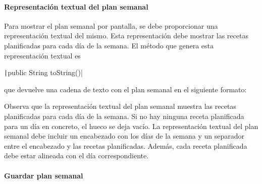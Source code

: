 \documentclass[
    a4paper, %
    12pt, %
]{CSSullivanBusinessReport}
\begin{document}
\paragraph{Representación textual del plan semanal}

Para mostrar el plan semanal por pantalla, se debe proporcionar una representación textual del mismo. Esta representación debe mostrar las recetas planificadas para cada día de la semana. El método que genera esta representación textual es

\texttt|public String toString()|

que devuelve una cadena de texto con el plan semanal en el siguiente formato:

\begin{fullwidth}
\end{fullwidth}

Observa que la representación textual del plan semanal muestra las recetas planificadas para cada día de la semana. Si no hay ninguna receta planificada para un día en concreto, el hueco se deja vacío. La representación textual del plan semanal debe incluir un encabezado con los días de la semana y un separador entre el encabezado y las recetas planificadas. Además, cada receta planificada debe estar alineada con el día correspondiente.

\paragraph{Guardar plan semanal}
\end{document}
